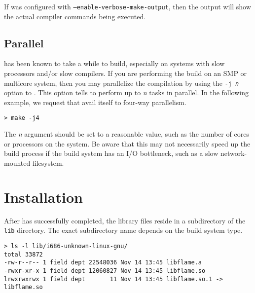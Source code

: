 If \libflame was configured with {\tt --enable-verbose-make-output}, then
the output will show the actual compiler commands being executed.

\subsection{Parallel \make}

\libflame has been known to take a while to build, especially on systems
with slow processors and/or slow compilers.
If you are performing the build on an SMP or multicore system, then you
may parallelize the compilation by using the {\tt -j {\em n}} option to
\makens.
This option tells \make to perform up to {\em n} tasks in parallel.
In the following example, we request that \make avail itself to four-way
parallelism.

\begin{Verbatim}[frame=single,framesep=2.5mm,xleftmargin=5mm,commandchars=\\\{\},fontsize=\footnotesize]
> make -j4
\end{Verbatim}

\noindent
The {\em n} argument should be set to a reasonable value, such as
the number of cores or processors on the system.
Be aware that this may not necessarily speed up the build process if the
build system has an I/O bottleneck, such as a slow network-mounted
filesystem.





\section{Installation}


After \make has successfully completed, the \libflame library files
reside in a subdirectory of the {\tt lib} directory.
The exact subdirectory name depends on the build system type.

\begin{Verbatim}[frame=single,framesep=2.5mm,xleftmargin=5mm,commandchars=\\\{\},fontsize=\footnotesize]
> ls -l lib/i686-unknown-linux-gnu/
total 33872
-rw-r--r-- 1 field dept 22548036 Nov 14 13:45 libflame.a
-rwxr-xr-x 1 field dept 12060827 Nov 14 13:45 libflame.so
lrwxrwxrwx 1 field dept       11 Nov 14 13:45 libflame.so.1 -> libflame.so
\end{Verbatim}

